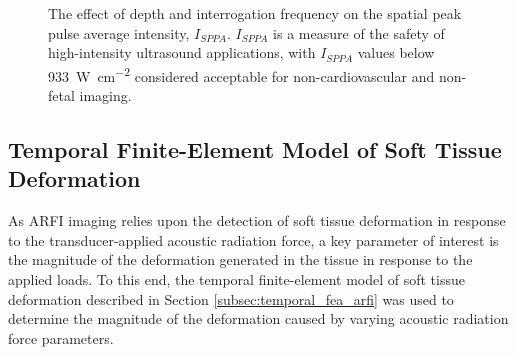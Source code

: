 			\begin{figure}[!htb]
				\centering
				\caption[$I_{SPPA}$ safety measures of ARFI pulses]{The effect of depth and interrogation frequency on the spatial peak pulse average intensity, $I_{SPPA}$. $I_{SPPA}$ is a measure of the safety of high-intensity ultrasound applications, with $I_{SPPA}$ values below \SI{933}{\W\per\cm\squared} considered acceptable for non-cardiovascular and non-fetal imaging.}
				\label{fig:freq-depth-isppa}
			\end{figure}

		\FloatBarrier
		\subsection{Temporal Finite-Element Model of Soft Tissue Deformation}
		\label{subsec:arfi_deformation_results}
			As ARFI imaging relies upon the detection of soft tissue deformation in response to the transducer-applied acoustic radiation force, a key parameter of interest is the magnitude of the deformation generated in the tissue in response to the applied loads. To this end, the temporal finite-element model of soft tissue deformation described in Section \ref{subsec:temporal_fea_arfi} was used to determine the magnitude of the deformation caused by varying acoustic radiation force parameters.

